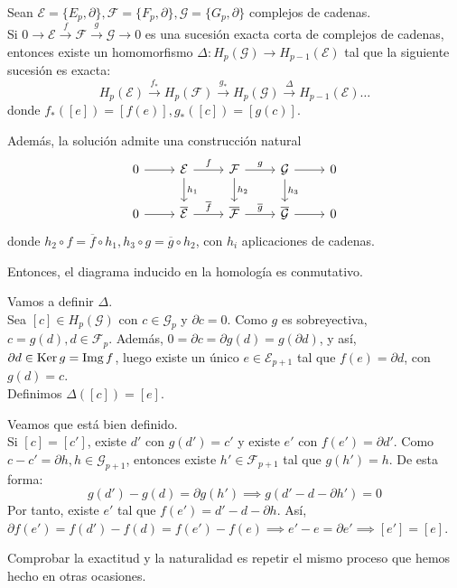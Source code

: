 \begin{theorem}
  Sean $\mathcal{E} = \{E_p, \partial\}, \mathcal{F} = \{F_p, \partial\}, \mathcal{G} = \{G_p, \partial\}$ complejos de cadenas. \\
  Si $0 \to \mathcal{E} \xrightarrow{f} \mathcal{F} \xrightarrow{g} \mathcal{G} \to 0$ es una sucesión exacta corta de complejos
  de cadenas, entonces existe un homomorfismo $\Delta \colon H_p(\mathcal{G}) \to H_{p-1}(\mathcal{E})$ tal que la siguiente
  sucesión es exacta:
  \[ H_p(\mathcal{E}) \xrightarrow{f_*} H_p(\mathcal{F}) \xrightarrow{g_*} H_p(\mathcal{G}) \xrightarrow{\Delta} H_{p-1}(\mathcal{E}) \dots \]
  donde $f_*([e]) = [f(e)], g_*([c]) = [g(c)]$.

  Además, la solución admite una construcción natural
  \[ \begin{tikzcd}
    0 \arrow{r} & \mathcal{E} \arrow{r}{f} \arrow{d}{h_1} & \mathcal{F} \arrow{r}{g} \arrow{d}{h_2} & \mathcal{G} \arrow{r} \arrow{d}{h_3} & 0 \\
    0 \arrow{r} & \overline{\mathcal{E}} \arrow{r}{\overline{f}} & \overline{\mathcal{F}} \arrow{r}{\overline{g}} & \overline{\mathcal{G}} \arrow{r} & 0
  \end{tikzcd} \]
  donde $h_2 \circ f = \overline{f} \circ h_1, h_3 \circ g = \overline{g} \circ h_2$, con $h_i$ aplicaciones de cadenas.

  Entonces, el diagrama inducido en la homología es conmutativo.
\end{theorem}

\begin{theorem}
  Vamos a definir $\Delta$. \\
  Sea $[c] \in H_p(\mathcal G)$ con $c \in \mathcal G_p$ y $\partial c = 0$. Como $g$ es sobreyectiva, $c = g(d), d \in \mathcal F_p$.
  Además, $0 = \partial c = \partial g(d) = g(\partial d)$, y así, $\partial d \in \operatorname{Ker} g = \operatorname{Img} f$, luego existe un único $e \in \mathcal E_{p+1}$
  tal que $f(e) = \partial d$, con $g(d) = c$. \\
  Definimos $\Delta([c]) = [e]$.

  Veamos que está bien definido. \\
  Si $[c] = [c']$, existe $d'$ con $g(d') = c'$ y existe $e'$ con $f(e') = \partial d'$. Como $c - c' = \partial h, h \in \mathcal G_{p+1}$,
  entonces existe $h' \in \mathcal F_{p+1}$ tal que $g(h') = h$. De esta forma:
  \[ g(d') - g(d) = \partial g(h') \implies g(d' - d - \partial h') = 0 \]
  Por tanto, existe $e'$ tal que $f(e') = d' - d - \partial h$. Así, $\partial f(e') = f(d') - f(d) = f(e') - f(e) \implies e' - e = \partial e'
  \implies [e'] = [e]$.

  Comprobar la exactitud y la naturalidad es repetir el mismo proceso que hemos hecho en otras ocasiones.
\end{theorem}

